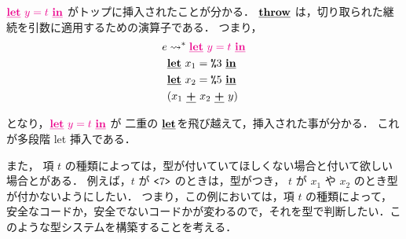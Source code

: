 $\magenta{\cLet~y=t~\cIn}$ がトップに挿入されたことが分かる．
$\cThrow$ は，切り取られた継続を引数に適用するための演算子である．
つまり，
\begin{align*}
  e & \too \magenta{\cLet~y=t~\cIn} \\
    & \cLet~x_1=\csp{3}~\cIn \\
    & \cLet~x_2=\csp{5}~\cIn \\
    & (x_1~\cPlus~x_2~\cPlus~y)
\end{align*}

となり，$\magenta{\cLet~y=t~\cIn}$ が 二重の $\cLet$を飛び越えて，挿入された事が分かる．
これが多段階 let 挿入である．

また， 項 $t$ の種類によっては，型が付いていてほしくない場合と付いて欲しい場合とがある．
例えば，$t$ が $\code{7}$ のときは，型がつき，
$t$ が $x_1$ や $x_2$ のとき型が付かないようにしたい．
つまり，この例においては，項 $t$ の種類によって，安全なコードか，安全でないコードかが変わるので，それを型で判断したい．このような型システムを構築することを考える．

